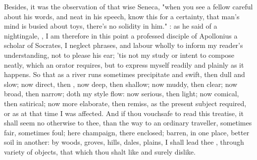 
Besides, it was the observation of that wise Seneca, "when
you see a fellow careful about his words, and neat in his speech, know this for
a certainty, that man's mind is busied about toys, there's no solidity in him."
: as he said of a nightingale,
, \etc{} I am therefore in this point a
professed disciple of Apollonius a scholar of Socrates, I
neglect phrases, and labour wholly to inform my reader's understanding, not to
please his ear; 'tis not my study or intent to compose neatly, which an orator
requires, but to express myself readily and plainly as it happens. So that as a
river runs sometimes precipitate and swift, then dull and slow; now direct,
then , now deep, then shallow; now muddy, then clear; now
broad, then narrow; doth my style flow: now serious, then light; now comical,
then satirical; now more elaborate, then remiss, as the present subject
required, or as at that time I was affected. And if thou vouchsafe to read this
treatise, it shall seem no otherwise to thee, than the way to an ordinary
traveller, sometimes fair, sometimes foul; here champaign, there enclosed;
barren, in one place, better soil in another: by woods, groves, hills, dales,
plains, \etc{} I shall lead thee , through variety of
objects, that which thou shalt like and surely dislike.

